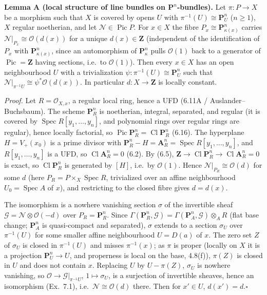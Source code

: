 \documentclass[11pt]{article}
\begin{document}
\textbf{Lemma A (local structure of line bundles on $\mathbf P^n$-bundles).} Let $\pi:P\to X$ be a morphism such that $X$ is covered by opens $U$ with $\pi^{-1}(U)\cong\mathbf P^n_U$ ($n\ge1$), $X$ regular noetherian, and let $\mathcal N\in\operatorname{Pic}P$. For $x\in X$ the fibre $P_x\cong\mathbf P^n_{\kappa(x)}$ carries $\mathcal N|_{P_x}\cong\mathcal O(d(x))$ for a unique $d(x)\in\mathbf Z$ (independent of the identification of $P_x$ with $\mathbf P^n_{\kappa(x)}$, since an automorphism of $\mathbf P^n_\kappa$ pulls $\mathcal O(1)$ back to a generator of $\operatorname{Pic}=\mathbf Z$ having sections, i.e.\ to $\mathcal O(1)$). Then every $x\in X$ has an open neighbourhood $U$ with a trivialization $\psi:\pi^{-1}(U)\cong\mathbf P^n_U$ such that $\mathcal N|_{\pi^{-1}U}\cong\psi^*\mathcal O(d(x))$. In particular $d:X\to\mathbf Z$ is locally constant.

\emph{Proof.} Let $R=\mathcal O_{X,x}$, a regular local ring, hence a UFD (6.11A / Auslander--Buchsbaum). The scheme $\mathbf P^n_R$ is noetherian, integral, separated, and regular (it is covered by $\operatorname{Spec}R[y_1,\dots,y_n]$, and polynomial rings over regular rings are regular), hence locally factorial, so $\operatorname{Pic}\mathbf P^n_R=\operatorname{Cl}\mathbf P^n_R$ (6.16). The hyperplane $H=V_+(x_0)$ is a prime divisor with $\mathbf P^n_R-H=\mathbf A^n_R=\operatorname{Spec}R[y_1,\dots,y_n]$, and $R[y_1,\dots,y_n]$ is a UFD, so $\operatorname{Cl}\mathbf A^n_R=0$ (6.2). By (6.5), $\mathbf Z\to\operatorname{Cl}\mathbf P^n_R\to\operatorname{Cl}\mathbf A^n_R=0$ is exact, so $\operatorname{Cl}\mathbf P^n_R$ is generated by $[H]$, i.e.\ by $\mathcal O(1)$. Hence $\mathcal N|_{P_R}\cong\mathcal O(d)$ for some $d$ (here $P_R=P\times_X\operatorname{Spec}R$, trivialized over an affine neighbourhood $U_0=\operatorname{Spec}A$ of $x$), and restricting to the closed fibre gives $d=d(x)$.

The isomorphism is a nowhere vanishing section $\sigma$ of the invertible sheaf $\mathcal G=\mathcal N\otimes\mathcal O(-d)$ over $P_R=\mathbf P^n_R$. Since $\Gamma(\mathbf P^n_R,\mathcal G)=\Gamma(\mathbf P^n_A,\mathcal G)\otimes_AR$ (flat base change; $\mathbf P^n_A$ is quasi-compact and separated), $\sigma$ extends to a section $\sigma_U$ over $\pi^{-1}(U)$ for some smaller affine neighbourhood $U=D(a)$ of $x$. The zero set $Z$ of $\sigma_U$ is closed in $\pi^{-1}(U)$ and misses $\pi^{-1}(x)$; as $\pi$ is proper (locally on $X$ it is a projection $\mathbf P^n_U\to U$, and properness is local on the base, 4.8(f)), $\pi(Z)$ is closed in $U$ and does not contain $x$. Replacing $U$ by $U-\pi(Z)$, $\sigma_U$ is nowhere vanishing, so $\mathcal O\to\mathcal G|_{\pi^{-1}U}$, $1\mapsto\sigma_U$, is a surjection of invertible sheaves, hence an isomorphism (Ex.~7.1), i.e.\ $\mathcal N\cong\mathcal O(d)$ there. Then for $x'\in U$, $d(x')=d$.\hfill$\square$
\end{document}
